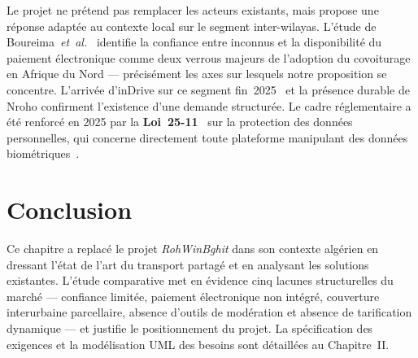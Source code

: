 Le projet ne prétend pas remplacer les acteurs existants, mais propose une réponse adaptée au contexte local sur le segment inter-wilayas. L'étude de Boureima~\textit{et~al.}~\cite{mounir_carpooling_developing_2022} identifie la confiance entre inconnus et la disponibilité du paiement électronique comme deux verrous majeurs de l'adoption du covoiturage en Afrique du Nord --- précisément les axes sur lesquels notre proposition se concentre. L'arrivée d'inDrive sur ce segment fin~2025~\cite{indrive_interwilaya_2025} et la présence durable de Nroho confirment l'existence d'une demande structurée. Le cadre réglementaire a été renforcé en 2025 par la \textbf{Loi~25-11}~\cite{loi2511_2025} sur la protection des données personnelles, qui concerne directement toute plateforme manipulant des données biométriques~\cite{anpdp_obligations_2026}.


\section{Conclusion}

Ce chapitre a replacé le projet \textit{RohWinBghit} dans son contexte algérien en dressant l'état de l'art du transport partagé et en analysant les solutions existantes. L'étude comparative met en évidence cinq lacunes structurelles du marché --- confiance limitée, paiement électronique non intégré, couverture interurbaine parcellaire, absence d'outils de modération et absence de tarification dynamique --- et justifie le positionnement du projet. La spécification des exigences et la modélisation UML des besoins sont détaillées au Chapitre~II.
